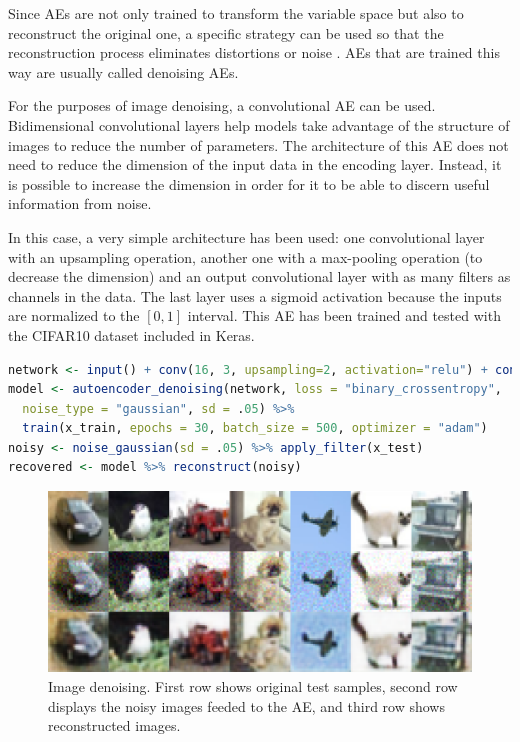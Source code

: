 \documentclass[
	fontsize=11pt, %
	twoside=false, %
	open=any, %
	secnumdepth=1, %
]{kaobook}
\begin{document}
Since AEs are not only trained to transform the variable space but also to reconstruct the original one, a specific strategy can be used so that the reconstruction process eliminates distortions or noise \cite{xie}. AEs that are trained this way are usually called denoising AEs.

For the purposes of image denoising, a convolutional AE can be used. Bidimensional convolutional layers \cite{dlbook-conv} help models take advantage of the structure of images to reduce the number of parameters. The architecture of this AE does not need to reduce the dimension of the input data in the encoding layer. Instead, it is possible to increase the dimension in order for it to be able to discern useful information from noise. 

In this case, a very simple architecture has been used: one convolutional layer with an upsampling operation, another one with a max-pooling operation (to decrease the dimension) and an output convolutional layer with as many filters as channels in the data. The last layer uses a sigmoid activation because the inputs are normalized to the $[0,1]$ interval. This AE has been trained and tested with the CIFAR10 dataset included in Keras.

\begin{lstlisting}[language=R]
network <- input() + conv(16, 3, upsampling=2, activation="relu") + conv(16, 3, max_pooling=2, activation="relu") + conv(3, 3, activation="sigmoid")
model <- autoencoder_denoising(network, loss = "binary_crossentropy", 
  noise_type = "gaussian", sd = .05) %>%
  train(x_train, epochs = 30, batch_size = 500, optimizer = "adam")
noisy <- noise_gaussian(sd = .05) %>% apply_filter(x_test)
recovered <- model %>% reconstruct(noisy)
\end{lstlisting}

\begin{figure}[ht]
    \centering
    \includegraphics[width=\textwidth]{denoising_cifar10.pdf}
    \caption{Image denoising. First row shows original test samples, second row displays the noisy images feeded to the AE, and third row shows reconstructed images.}
    \label{fig:denoising}
\end{figure}
\end{document}
